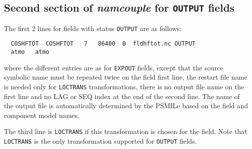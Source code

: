 %
%

\subsection{Second section of {\it namcouple} for {\tt OUTPUT} fields}
\label{subsubsec_secondOUTPUT}
  The first 2 lines for fields with status {\tt OUTPUT} are as follows:
  \begin{verbatim}
  COSHFTOT  COSHFTOT   7   86400  0  fldhftot.nc OUTPUT 
  atmo   atmo 
  \end{verbatim}
where the different entries are as for {\tt EXPOUT} fields, except
that the source symbolic name must be repeated twice on the field
first line, the restart file name is needed only for {\tt LOCTRANS} transformations, there is no output file
name on the first line and no LAG or  SEQ index at the end of the second line.
The name of the output file is automatically determined by the PSMILe based on the field and component model names.

The third line is {\tt LOCTRANS} if this transformation is chosen for
the field. Note that {\tt LOCTRANS} is the only transformation
supported for {\tt OUTPUT} fields.

